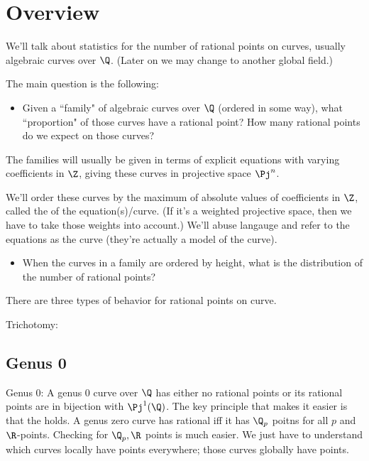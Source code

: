 \chapter{Overview}

We'll talk about statistics for the number of rational points on curves, usually algebraic curves over $\Q$. (Later on we may change to another global field.)

The main question is the following: 
\begin{itemize}
\item
Given a ``family" of algebraic curves over $\Q$ (ordered in some way), what ``proportion" of those curves have a rational point? How many rational points do we expect on those curves?
\end{itemize}

The families will usually be given in terms of explicit equations with varying coefficients in $\Z$, %
giving these curves in projective space $\Pj^n$. 

We'll order these curves by the maximum of absolute values of coefficients in $\Z$, called the  of the equation(s)/curve. (If it's a weighted projective space, then we have to take those weights into account.) We'll abuse langauge and refer to the equations as the curve (they're actually a model of the curve).

\begin{itemize}
\item
When the curves in a family are ordered by height, what is the distribution of the number of rational points?
\end{itemize}

There are three types of behavior for rational points on curve. 

Trichotomy:

\section{Genus 0}

Genus 0: A genus 0 curve over $\Q$ has either no rational points or its rational points are in bijection with $\Pj^1(\Q)$.
The key principle that makes it easier is that the  holds. A genus zero curve has rational iff it has $\Q_p$ poitns for all $p$ and $\R$-points. Checking for $\Q_p,\R$ points is much easier. We just have to understand which curves locally have points everywhere; those curves globally have points.

